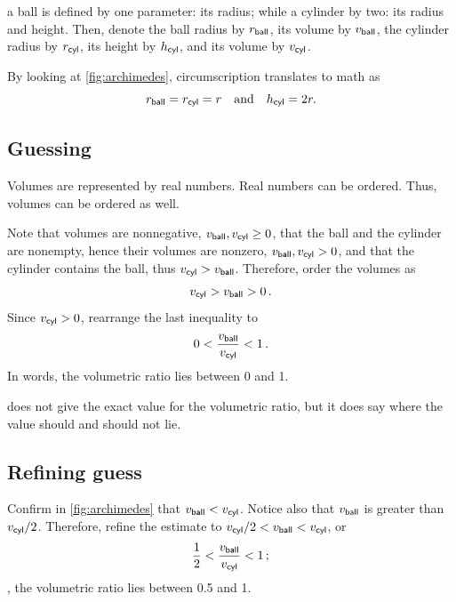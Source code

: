  a ball is defined by one parameter: its radius; while a cylinder by two: its radius and height. Then, denote the ball radius by $r_{\text{\textsf{ball}}}$, its volume by $v_{\text{\textsf{ball}}}$, the cylinder radius by $r_{\text{\textsf{cyl}}}$, its height by $h_{\text{\textsf{cyl}}}$, and its volume by $v_{\text{\textsf{cyl}}}$.

 By looking at \cref{fig:archimedes}, circumscription translates to math as
%
\begin{equation}\label{eq:volumetricratioconstraint}
  r_{\text{\textsf{ball}}} = r_{\text{\textsf{cyl}}} = r\quad\text{and}\quad h_{\text{\textsf{cyl}}} = 2r.
\end{equation}



\subsection{Guessing} %
\label{sub:guessing}
%
 Volumes are represented by real numbers. Real numbers can be ordered. Thus, volumes can be ordered as well. 

 Note that volumes are nonnegative, $v_{\text{\textsf{ball}}},v_{\text{\textsf{cyl}}}\geq 0$, that the ball and the cylinder are nonempty, hence their volumes are nonzero, $v_{\text{\textsf{ball}}},v_{\text{\textsf{cyl}}} > 0$, and that the cylinder contains the ball, thus $v_{\text{\textsf{cyl}}} > v_{\text{\textsf{ball}}}$. Therefore, order the volumes as 
%
\begin{equation*}
  v_{\text{\textsf{cyl}}} > v_{\text{\textsf{ball}}} > 0\,.
\end{equation*}
%
 Since $v_{\text{\textsf{cyl}}} > 0$, rearrange the last inequality to
%
\begin{equation}\label{eq:guesstimate}
  0 < \dfrac{v_{\text{\textsf{ball}}}}{v_{\text{\textsf{cyl}}}} < 1\,.
\end{equation}
%
 In words, the volumetric ratio lies between 0 and 1. 

  does not give the exact value for the volumetric ratio, but it does say where the value should and should not lie.



\subsection{Refining guess} %
\label{sub:refining_guess}
%
 Confirm in \cref{fig:archimedes} that $v_{\text{\textsf{ball}}} < v_{\text{\textsf{cyl}}}$. Notice also that $v_{\text{\textsf{ball}}}$ is greater than $v_{\text{\textsf{cyl}}}/2$. Therefore, refine the estimate to $v_{\text{\textsf{cyl}}}/2 < v_{\text{\textsf{ball}}} < v_{\text{\textsf{cyl}}}$, or
%
\begin{equation}\label{eq:firstestimate}
  \dfrac 12 < \dfrac{v_{\text{\textsf{ball}}}}{v_{\text{\textsf{cyl}}}} < 1\,;
\end{equation}
%
\ie, the volumetric ratio lies between 0.5 and 1.


